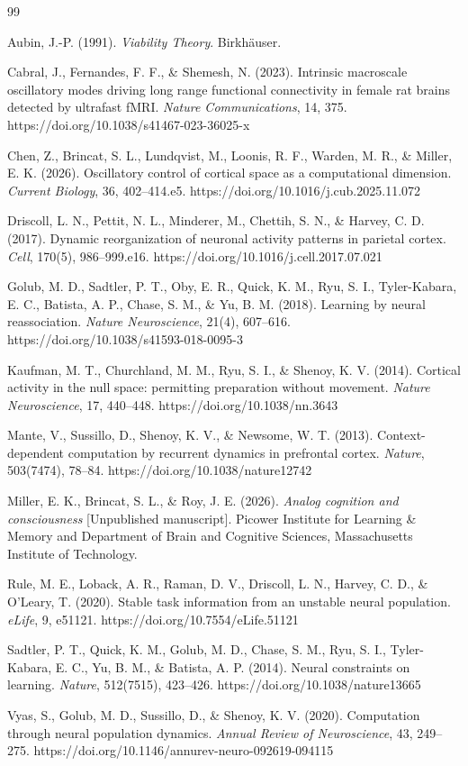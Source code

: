 \documentclass[11pt]{article}
\begin{document}
\newpage
\begin{thebibliography}{99}

 Aubin, J.-P. (1991). \textit{Viability Theory}. Birkh\"auser.

 Cabral, J., Fernandes, F. F., \& Shemesh, N. (2023). Intrinsic macroscale oscillatory modes driving long range functional connectivity in female rat brains detected by ultrafast fMRI. \textit{Nature Communications}, 14, 375. https://doi.org/10.1038/s41467-023-36025-x

 Chen, Z., Brincat, S. L., Lundqvist, M., Loonis, R. F., Warden, M. R., \& Miller, E. K. (2026). Oscillatory control of cortical space as a computational dimension. \textit{Current Biology}, 36, 402–414.e5. https://doi.org/10.1016/j.cub.2025.11.072

 Driscoll, L. N., Pettit, N. L., Minderer, M., Chettih, S. N., \& Harvey, C. D. (2017). Dynamic reorganization of neuronal activity patterns in parietal cortex. \textit{Cell}, 170(5), 986–999.e16. https://doi.org/10.1016/j.cell.2017.07.021

 Golub, M. D., Sadtler, P. T., Oby, E. R., Quick, K. M., Ryu, S. I., Tyler-Kabara, E. C., Batista, A. P., Chase, S. M., \& Yu, B. M. (2018). Learning by neural reassociation. \textit{Nature Neuroscience}, 21(4), 607–616. https://doi.org/10.1038/s41593-018-0095-3

 Kaufman, M. T., Churchland, M. M., Ryu, S. I., \& Shenoy, K. V. (2014). Cortical activity in the null space: permitting preparation without movement. \textit{Nature Neuroscience}, 17, 440–448. https://doi.org/10.1038/nn.3643

 Mante, V., Sussillo, D., Shenoy, K. V., \& Newsome, W. T. (2013). Context-dependent computation by recurrent dynamics in prefrontal cortex. \textit{Nature}, 503(7474), 78–84. https://doi.org/10.1038/nature12742

 Miller, E. K., Brincat, S. L., \& Roy, J. E. (2026). \textit{Analog cognition and consciousness} [Unpublished manuscript]. Picower Institute for Learning \& Memory and Department of Brain and Cognitive Sciences, Massachusetts Institute of Technology.

 Rule, M. E., Loback, A. R., Raman, D. V., Driscoll, L. N., Harvey, C. D., \& O'Leary, T. (2020). Stable task information from an unstable neural population. \textit{eLife}, 9, e51121. https://doi.org/10.7554/eLife.51121

 Sadtler, P. T., Quick, K. M., Golub, M. D., Chase, S. M., Ryu, S. I., Tyler-Kabara, E. C., Yu, B. M., \& Batista, A. P. (2014). Neural constraints on learning. \textit{Nature}, 512(7515), 423–426. https://doi.org/10.1038/nature13665

 Vyas, S., Golub, M. D., Sussillo, D., \& Shenoy, K. V. (2020). Computation through neural population dynamics. \textit{Annual Review of Neuroscience}, 43, 249–275. https://doi.org/10.1146/annurev-neuro-092619-094115

\end{thebibliography}
\end{document}
